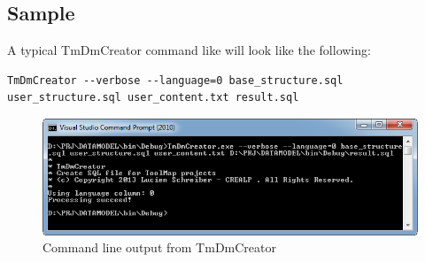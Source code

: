 \documentclass[a4paper, 12pt]{article}
\begin{document}
\subsection{Sample}
A typical TmDmCreator command like will look like the following: 

\begin{lstlisting}
TmDmCreator --verbose --language=0 base_structure.sql user_structure.sql user_content.txt result.sql
\end{lstlisting}

\begin{figure} [htbp]
	\centering
    \includegraphics[width=1\textwidth]{img/command-line-tmdmcreator.png}
    \caption{Command line output from TmDmCreator}
    \label{fig:command-line-output}
\end{figure}
\end{document}
